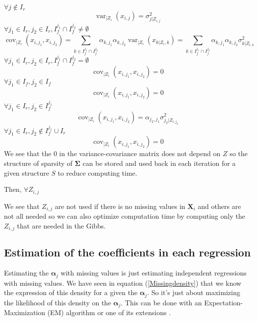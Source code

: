 \documentclass[11pt,a4paper]{report}
\begin{document}
	$\forall j \notin I_r $
\begin{equation}
	\operatorname{var}_{|Z_{i}}(x_{i,j})=\sigma_{j|Z_{i,j}}^2
\end{equation}			
	$\forall j_1 \in I_r, j_2 \in I_r,I_f^{j_1}\cap I_f^{j_2}\neq \emptyset $
	\begin{equation}
	\operatorname{cov}_{|Z_{i}}(x_{i,j_1},x_{i,j_2})=\sum_{k\in I_f^{j_1}\cap I_f^{j_2}}\alpha_{k,j_1}\alpha_{k,j_2}\operatorname{var}_{|Z_i}(x_{k|Z_i,k}) =\sum_{k\in I_f^{j_1}\cap I_f^{j_2}}\alpha_{k,j_1}\alpha_{k,j_2}\sigma_{k|Z_{i,k}}^2
\end{equation}
	$\forall j_1 \in I_r, j_2 \in I_r,I_f^{j_1}\cap I_f^{j_2}= \emptyset $
	\begin{equation}
	\operatorname{cov}_{|Z_{i}}(x_{i,j_1},x_{i,j_2})=0
\end{equation}
	$\forall j_1 \in I_f, j_2 \in I_f$
	\begin{equation}
	\operatorname{cov}_{|Z_{i}}(x_{i,j_1},x_{i,j_2})=0
\end{equation}
	$\forall j_1 \in I_r, j_2 \in I_f^{j_1}$
	\begin{equation}
	\operatorname{cov}_{|Z_{i}}(x_{i,j_1},x_{i,j_2})= \alpha_{j_2,j_1}\sigma^2_{j_2|Z_{i,j_2}}
\end{equation}
$\forall j_1 \in I_r, j_2 \notin I_f^{j_1}\cup I_r$
	\begin{equation}
	\operatorname{cov}_{|Z_{i}}(x_{i,j_1},x_{i,j_2})= 0
\end{equation}
We see that the $0$ in the variance-covariance matrix does not depend on $Z$ so the structure of sparsity of $\boldsymbol{\Sigma}$ can be stored and used back in each iteration for a given structure $S$ to reduce computing time.

	Then, $\forall Z_{i,j}$
	
	
	We see that $Z_{i,j}$ are not used if there is no missing values in $\boldsymbol{X}_i$ and others are not all needed so we can also optimize computation time by  computing only the $Z_{i,j}$ that are needed in the Gibbs.
\newpage
		\subsection{Estimation of the coefficients in each regression}
			Estimating the $\boldsymbol{\alpha}_j$  with missing values is just estimating independent regressions with missing values. We have seen in equation (\ref{Missingdensity}) that we know the expression of this density for a given the $\boldsymbol{\alpha}_j$. So it's just about maximizing the likelihood of this density on the $\boldsymbol{\alpha}_j$. This can be done with an Expectation-Maximization (EM) algorithm \cite{dempster1977maximum} or one of its extensions \cite{mclachlan2007algorithm}.
			
\end{document}

